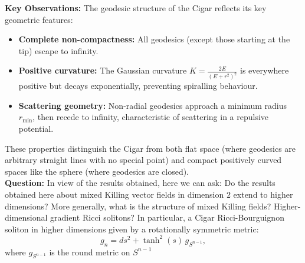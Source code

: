 \documentclass{article}
\theoremstyle{definition}
\theoremstyle{remark}
\begin{document}
\vspace{0.1in}

\noindent
{\bf Key Observations:} The geodesic structure of the Cigar reflects its key geometric features:

\begin{itemize}


\item \textbf{Complete non-compactness:} All geodesics (except those starting at 
the tip) escape to infinity.

\item \textbf{Positive curvature:} The Gaussian curvature $ K = \frac{2E}{(E+r^2)^2}$ is 
everywhere positive but decays exponentially, preventing spiralling behaviour.

\item \textbf{Scattering geometry:} Non-radial geodesics approach a minimum 
radius $r_{\min}$, then recede to infinity, characteristic of scattering in a 
repulsive potential.
\end{itemize}

These properties distinguish the Cigar from both flat space (where geodesics 
are arbitrary straight lines with no special point) and compact positively 
curved spaces like the sphere (where geodesics are closed).\\

\noindent
{\bf Question:}
In view of the results obtained,  here we can ask: 
Do the results obtained here about mixed  Killing vector fields
 in dimension $2$ extend to higher dimensions? More generally, what is the structure of mixed Killing fields? Higher-dimensional gradient Ricci solitons? In particular, a Cigar Ricci-Bourguignon soliton in higher dimensions given by a rotationally symmetric metric:
\[
g_n = ds^2 + \tanh^2(s) \, g_{S^{n-1}},
\]
where $g_{S^{n-1}}$ is the round metric on $S^{n-1}$


	
\end{document}
